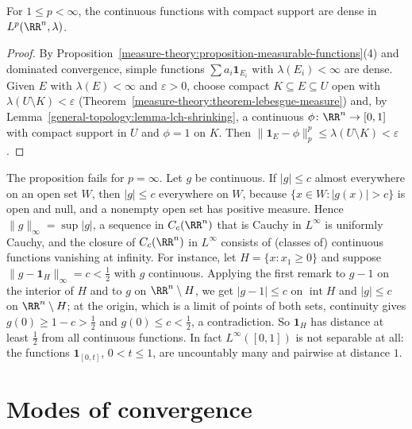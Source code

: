 \begin{proposition}\label{measure-theory:proposition-density}
For $1 \leq p < \infty$, the continuous functions with compact support are dense in $L^p(\RR^n, \lambda)$.
\end{proposition}

\begin{proof}
By Proposition~\ref{measure-theory:proposition-measurable-functions}(4) and dominated convergence, simple functions $\sum a_i\mathbf{1}_{E_i}$ with $\lambda(E_i) < \infty$ are dense. Given $E$ with $\lambda(E) < \infty$ and
$\varepsilon > 0$, choose compact $K \subseteq E \subseteq U$ open with $\lambda(U \setminus K) < \varepsilon$ (Theorem~\ref{measure-theory:theorem-lebesgue-measure}) and, by
Lemma~\ref{general-topology:lemma-lch-shrinking}, a continuous $\phi \colon \RR^n \to [0, 1]$ with compact support in $U$ and $\phi = 1$ on $K$. Then $\|\mathbf{1}_E - \phi\|_p^p \leq \lambda(U \setminus K) < \varepsilon$.
\end{proof}

\begin{counterexample}\label{measure-theory:counterexample-density-infinity}
The proposition fails for $p = \infty$. Let $g$ be continuous. If $|g| \leq c$ almost everywhere on an open set $W$, then $|g| \leq c$ everywhere on $W$, because $\{x \in W : |g(x)| > c\}$ is open and null,
and a nonempty open set has positive measure. Hence $\|g\|_\infty = \sup|g|$, a sequence in $C_c(\RR^n)$ that is Cauchy in $L^\infty$ is uniformly Cauchy, and the closure of $C_c(\RR^n)$ in $L^\infty$
consists of (classes of) continuous functions vanishing at infinity. For instance, let $H = \{x : x_1 \geq 0\}$ and suppose $\|g - \mathbf{1}_H\|_\infty = c < \frac12$ with $g$ continuous. Applying the
first remark to $g - 1$ on the interior of $H$ and to $g$ on $\RR^n \setminus H$, we get $|g - 1| \leq c$ on $\operatorname{int}H$ and $|g| \leq c$ on $\RR^n \setminus H$; at the origin, which is a limit of points
of both sets, continuity gives $g(0) \geq 1 - c > \frac12$ and $g(0) \leq c < \frac12$, a contradiction. So $\mathbf{1}_H$ has distance at least $\frac12$ from all continuous functions. In fact
$L^\infty([0, 1])$ is not separable at all: the functions $\mathbf{1}_{[0, t]}$, $0 < t \leq 1$, are uncountably many and pairwise at distance $1$.
\end{counterexample}

\section{Modes of convergence}\label{measure-theory:section-modes}

